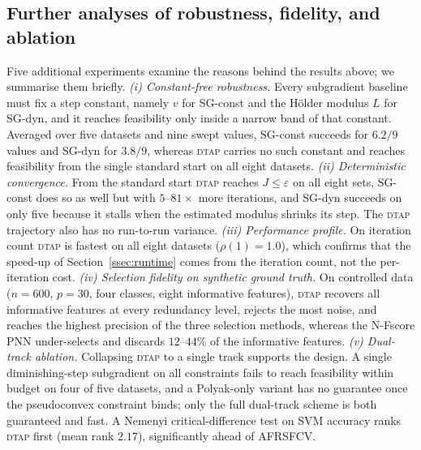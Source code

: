 \documentclass[]{interact}
\theoremstyle{plain}
\theoremstyle{definition}
\theoremstyle{remark}
\newcommand{\dtap}{\textsc{dtap}}
\begin{document}
\subsection{Further analyses of robustness, fidelity, and ablation}\label{ssec:further}
Five additional experiments examine the reasons behind the results above; we summarise them briefly. \emph{(i) Constant-free robustness.} Every subgradient baseline must fix a step constant, namely $v$ for SG-const and the H\"older modulus $L$ for SG-dyn, and it reaches feasibility only inside a narrow band of that constant. Averaged over five datasets and nine swept values, SG-const succeeds for $6.2/9$ values and SG-dyn for $3.8/9$, whereas \dtap{} carries no such constant and reaches feasibility from the single standard start on all eight datasets. \emph{(ii) Deterministic convergence.} From the standard start \dtap{} reaches $J\le\varepsilon$ on all eight sets, SG-const does so as well but with $5$--$81\times$ more iterations, and SG-dyn succeeds on only five because it stalls when the estimated modulus shrinks its step. The \dtap{} trajectory also has no run-to-run variance. \emph{(iii) Performance profile.} On iteration count \dtap{} is fastest on all eight datasets ($\rho(1)=1.0$), which confirms that the speed-up of Section~\ref{ssec:runtime} comes from the iteration count, not the per-iteration cost. \emph{(iv) Selection fidelity on synthetic ground truth.} On controlled data ($n{=}600$, $p{=}30$, four classes, eight informative features), \dtap{} recovers all informative features at every redundancy level, rejects the most noise, and reaches the highest precision of the three selection methods, whereas the N-Fscore PNN under-selects and discards $12$--$44\%$ of the informative features. \emph{(v) Dual-track ablation.} Collapsing \dtap{} to a single track supports the design. A single diminishing-step subgradient on all constraints fails to reach feasibility within budget on four of five datasets, and a Polyak-only variant has no guarantee once the pseudoconvex constraint binds; only the full dual-track scheme is both guaranteed and fast. A Nemenyi critical-difference test on SVM accuracy ranks \dtap{} first (mean rank $2.17$), significantly ahead of AFRSFCV.
\end{document}
